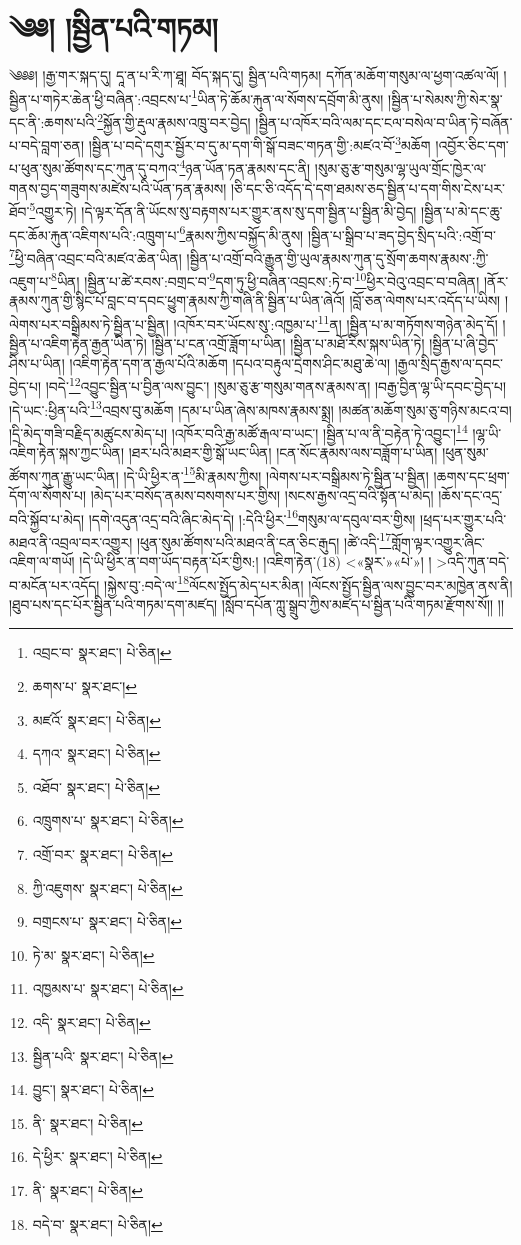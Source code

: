 \setcounter{footnote}{0} 
\chapter{༄༅། །སྦྱིན་པའི་གཏམ།}༄༅༅། །རྒྱ་གར་སྐད་དུ། དཱ་ན་པ་རི་ཀ་ཐཱ། བོད་སྐད་དུ། སྦྱིན་པའི་གཏམ། དཀོན་མཆོག་གསུམ་ལ་ཕྱག་འཚལ་ལོ། །སྦྱིན་པ་གཏེར་ཆེན་ཕྱི་བཞིན་:འབྲངས་པ་\footnote{འབྲང་བ་  སྣར་ཐང་།  པེ་ཅིན། }ཡིན་ཏེ་ཆོམ་རྐུན་ལ་སོགས་དབྲོག་མི་ནུས། །སྦྱིན་པ་སེམས་ཀྱི་སེར་སྣ་དང་ནི་:ཆགས་པའི་\footnote{ཆགས་པ་  སྣར་ཐང་། }སྐྱོན་གྱི་རྡུལ་རྣམས་འཁྲུ་བར་བྱེད། །སྦྱིན་པ་འཁོར་བའི་ལམ་དང་ངལ་བསེལ་བ་ཡིན་ཏེ་བཞོན་པ་བདེ་བླག་ཅན། །སྦྱིན་པ་བདེ་དགུར་སྦྱོར་བ་དུ་མ་དག་གི་སྒོ་བཟང་གཏན་གྱི་:མཛའ་བོ་\footnote{མཛའོ་  སྣར་ཐང་།  པེ་ཅིན། }མཆོག །འབྱོར་ཅིང་དག་པ་ཕུན་སུམ་ཚོགས་དང་ཀུན་དུ་བཀའ་\footnote{དཀའ་  སྣར་ཐང་།  པེ་ཅིན། }ཉན་ཡོན་ཏན་རྣམས་དང་ནི། །སུམ་ཅུ་རྩ་གསུམ་ལྷ་ཡུལ་གྲོང་ཁྱེར་ལ་གནས་བྱད་གཟུགས་མཛེས་པའི་ཡོན་ཏན་རྣམས། །ཅི་དང་ཅི་འདོད་དེ་དག་ཐམས་ཅད་སྦྱིན་པ་དག་གིས་ངེས་པར་ཐོབ་\footnote{འཐོབ་  སྣར་ཐང་།  པེ་ཅིན། }འགྱུར་ཏེ། །དེ་ལྟར་དོན་ནི་ཡོངས་སུ་བརྟགས་པར་གྱུར་ནས་སུ་དག་སྦྱིན་པ་སྦྱིན་མི་བྱེད། །སྦྱིན་པ་མེ་དང་ཆུ་དང་ཆོམ་རྐུན་འཇིགས་པའི་:འཁྲུག་པ་\footnote{འཁྲུགས་པ་  སྣར་ཐང་།  པེ་ཅིན། }རྣམས་ཀྱིས་བསྐྱོད་མི་ནུས། །སྦྱིན་པ་སྒྲིབ་པ་ཟད་བྱེད་སྲིད་པའི་:འགྲོ་བ་\footnote{འགྲོ་བར་  སྣར་ཐང་།  པེ་ཅིན། }ཕྱི་བཞིན་འབྲང་བའི་མཛའ་ཆེན་ཡིན། །སྦྱིན་པ་འགྲོ་བའི་རྒྱུན་གྱི་ཡུལ་རྣམས་ཀུན་དུ་སྲོག་ཆགས་རྣམས་:ཀྱི་འཇུག་པ་\footnote{ཀྱི་འཇུགས་  སྣར་ཐང་།  པེ་ཅིན། }ཡིན། །སྦྱིན་པ་ཚེ་རབས་:བགྲང་བ་\footnote{བགྲངས་པ་  སྣར་ཐང་།  པེ་ཅིན། }དག་ཏུ་ཕྱི་བཞིན་འབྲངས་:ཏེ་བ་\footnote{ཏེ་མ་  སྣར་ཐང་།  པེ་ཅིན། }ཕྱིར་བེའུ་འབྲང་བ་བཞིན། །ནོར་རྣམས་ཀུན་གྱི་སྙིང་པོ་བླང་བ་དབང་ཕྱུག་རྣམས་ཀྱི་གཞི་ནི་སྦྱིན་པ་ཡིན་ཞེའོ། །བློ་ཅན་ལེགས་པར་འདོད་པ་ཡིས། །ལེགས་པར་བསྒྲིམས་ཏེ་སྦྱིན་པ་སྦྱིན། །འཁོར་བར་ཡོངས་སུ་:འཁྱམ་པ་\footnote{འཁྱམས་པ་  སྣར་ཐང་།  པེ་ཅིན། }ན། །སྦྱིན་པ་མ་གཏོགས་གཉེན་མེད་དོ། །སྦྱིན་པ་འཇིག་རྟེན་རྒྱན་ཡིན་ཏེ། །སྦྱིན་པ་ངན་འགྲོ་ཟློག་པ་ཡིན། །སྦྱིན་པ་མཐོ་རིས་སྐས་ཡིན་ཏེ། །སྦྱིན་པ་ཞི་བྱེད་ཤིས་པ་ཡིན། །འཇིག་རྟེན་དག་ན་རྒྱལ་པོའི་མཆོག །དཔའ་བརྟུལ་དྲེགས་ཤིང་མཐུ་ཆེ་ལ། །རྒྱལ་སྲིད་རྒྱས་ལ་དབང་བྱེད་པ། །བདེ་\footnote{འདི་  སྣར་ཐང་།  པེ་ཅིན། }འབྱུང་སྦྱིན་པ་བྱིན་ལས་བྱུང་། །སུམ་ཅུ་རྩ་གསུམ་གནས་རྣམས་ན། །བརྒྱ་བྱིན་ལྷ་ཡི་དབང་བྱེད་པ། །དེ་ཡང་:ཕྱིན་པའི་\footnote{སྦྱིན་པའི་  སྣར་ཐང་།  པེ་ཅིན། }འབྲས་བུ་མཆོག །དམ་པ་ཡིན་ཞེས་མཁས་རྣམས་སྨྲ། །མཚན་མཆོག་སུམ་ཅུ་གཉིས་མངའ་བ། །དྲི་མེད་གཟི་བརྗིད་མཚུངས་མེད་པ། །འཁོར་བའི་རྒྱ་མཚོ་རྒལ་བ་ཡང་། །སྦྱིན་པ་ལ་ནི་བརྟེན་ཏེ་འབྱུང་།\footnote{བྱུང་།  སྣར་ཐང་།  པེ་ཅིན། } །ལྷ་ཡི་འཇིག་རྟེན་སྐས་ཀྱང་ཡིན། །ཐར་པའི་མཐར་གྱི་སྒོ་ཡང་ཡིན། །ངན་སོང་རྣམས་ལས་བཟློག་པ་ཡིན། །ཕུན་སུམ་ཚོགས་ཀུན་རྒྱུ་ཡང་ཡིན། །དེ་ཡི་ཕྱིར་ན་\footnote{ནི་  སྣར་ཐང་།  པེ་ཅིན། }མི་རྣམས་ཀྱིས། །ལེགས་པར་བསྒྲིམས་ཏེ་སྦྱིན་པ་སྦྱིན། །ཆགས་དང་ཕྲག་དོག་ལ་སོགས་པ། །མེད་པར་བསོད་ནམས་བསགས་པར་གྱིས། །སངས་རྒྱས་འདྲ་བའི་སྟོན་པ་མེད། །ཆོས་དང་འདྲ་བའི་སྐྱོབ་པ་མེད། །དགེ་འདུན་འདྲ་བའི་ཞིང་མེད་དེ། །:དེའི་ཕྱིར་\footnote{དེ་ཕྱིར་  སྣར་ཐང་།  པེ་ཅིན། }གསུམ་ལ་དབུལ་བར་གྱིས། །ཕྲད་པར་གྱུར་པའི་མཐའ་ནི་འབྲལ་བར་འགྱུར། །ཕུན་སུམ་ཚོགས་པའི་མཐའ་ནི་ངན་ཅིང་རྒུད། །ཚེ་འདི་\footnote{ནི་  སྣར་ཐང་།  པེ་ཅིན། }གློག་ལྟར་འགྱུར་ཞིང་འཇིག་ལ་གཡོ། །དེ་ཡི་ཕྱིར་ན་བག་ཡོད་བརྟན་པོར་གྱིས:། །འཇིག་རྟེན་(18) <«སྣར་»«པེ་»། །
>འདི་ཀུན་བདེ་བ་མངོན་པར་འདོད། །སྐྱེས་བུ་:བདེ་ལ་\footnote{བདེ་བ་  སྣར་ཐང་།  པེ་ཅིན། }ལོངས་སྤྱོད་མེད་པར་མིན། །ལོངས་སྤྱོད་སྦྱིན་ལས་བྱུང་བར་མཁྱེན་ནས་ནི། །ཐུབ་པས་དང་པོར་སྦྱིན་པའི་གཏམ་དག་མཛད། །སློབ་དཔོན་ཀླུ་སྒྲུབ་ཀྱིས་མཛད་པ་སྦྱིན་པའི་གཏམ་རྫོགས་སོ།། །།